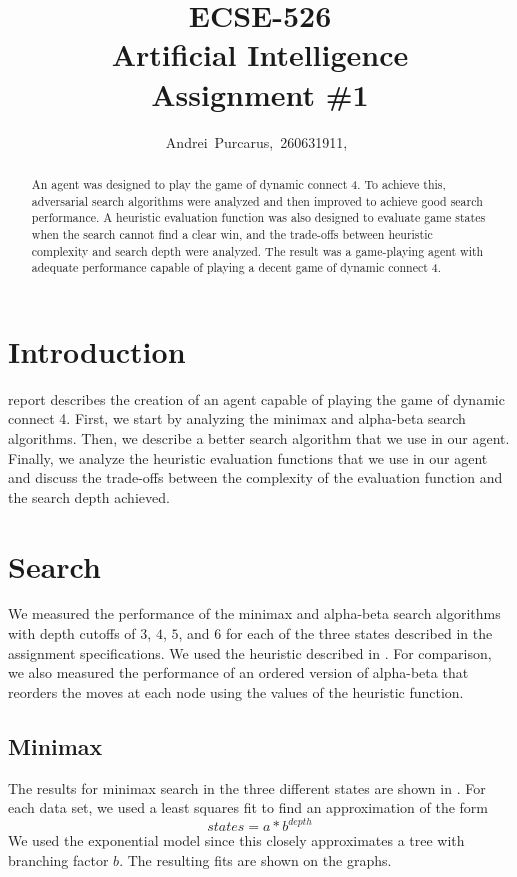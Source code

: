 \documentclass[journal,hidelinks]{IEEEtran}
\title{ECSE-526 \\ Artificial Intelligence \\ Assignment \#1}
\author{Andrei~Purcarus,~260631911,~\IEEEmembership{McGill~University}}
\begin{document}
\sloppy

\maketitle

\begin{abstract}

An agent was designed to play the game of dynamic connect 4. To achieve this, adversarial search algorithms were analyzed and then improved to achieve good search performance. A heuristic evaluation function was also designed to evaluate game states when the search cannot find a clear win, and the trade-offs between heuristic complexity and search depth were analyzed. The result was a game-playing agent with adequate performance capable of playing a decent game of dynamic connect 4.

\end{abstract}

\section{Introduction}

 report describes the creation of an agent capable of playing the game of dynamic connect 4. First, we start by analyzing the minimax and alpha-beta search algorithms. Then, we describe a better search algorithm that we use in our agent. Finally, we analyze the heuristic evaluation functions that we use in our agent and discuss the trade-offs between the complexity of the evaluation function and the search depth achieved.

\section{Search}

We measured the performance of the minimax and alpha-beta search algorithms with depth cutoffs of $3$, $4$, $5$, and $6$ for each of the three states described in the assignment specifications. We used the heuristic described in . For comparison, we also measured the performance of an ordered version of alpha-beta that reorders the moves at each node using the values of the heuristic function.

\subsection{Minimax}

The results for minimax search in the three different states are shown in . For each data set, we used a least squares fit to find an approximation of the form
\[
states = a * b^{depth}
\]
We used the exponential model since this closely approximates a tree with branching factor $b$. The resulting fits are shown on the graphs.
\end{document}
